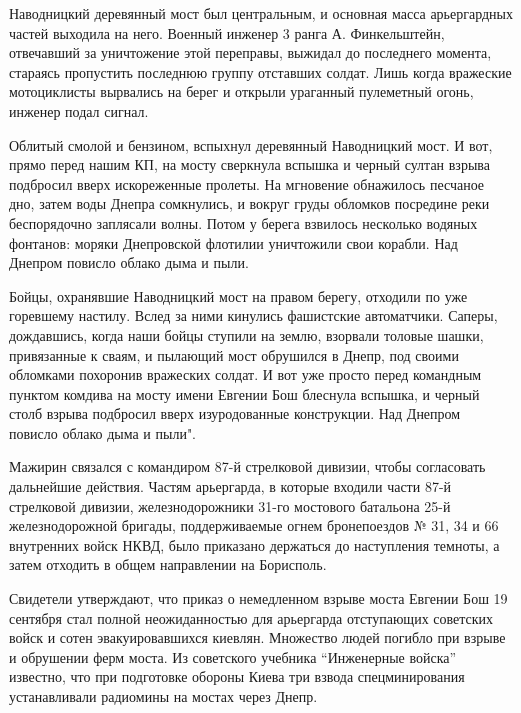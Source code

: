 
Наводницкий деревянный мост был центральным, и основная масса арьергардных
частей выходила на него. Военный инженер 3 ранга А. Финкельштейн, отвечавший за
уничтожение этой переправы, выжидал до последнего момента, стараясь пропустить
последнюю группу отставших солдат. Лишь когда вражеские мотоциклисты вырвались
на берег и открыли ураганный пулеметный огонь, инженер подал сигнал.


Облитый смолой и бензином, вспыхнул деревянный Наводницкий мост. И вот, прямо
перед нашим КП, на мосту сверкнула вспышка и черный султан взрыва подбросил
вверх искореженные  пролеты. На мгновение обнажилось песчаное дно, затем воды
Днепра сомкнулись, и вокруг  груды обломков посредине реки беспорядочно
заплясали волны. Потом у берега взвилось несколько водяных фонтанов: моряки
Днепровской флотилии уничтожили свои корабли. Над Днепром повисло облако дыма и
пыли.


Бойцы, охранявшие Наводницкий мост на правом берегу, отходили по уже горевшему
настилу. Вслед за ними кинулись фашистские автоматчики. Саперы, дождавшись,
когда наши бойцы ступили на землю, взорвали толовые шашки, привязанные к сваям,
и пылающий мост обрушился в Днепр, под своими обломками похоронив вражеских
солдат. И вот уже просто перед командным пунктом комдива на мосту имени Евгении
Бош блеснула вспышка, и черный столб взрыва подбросил вверх изуродованные
конструкции. Над Днепром повисло облако дыма и пыли".

Мажирин связался с командиром 87-й стрелковой дивизии, чтобы согласовать
дальнейшие действия. Частям арьергарда, в которые входили части 87-й стрелковой
дивизии,  железнодорожники 31-го мостового батальона 25-й железнодорожной
бригады, поддерживаемые огнем бронепоездов № 31, 34 и 66 внутренних войск НКВД,
было приказано держаться до наступления темноты, а затем отходить в общем
направлении на Борисполь.

Свидетели утверждают, что приказ о немедленном взрыве моста Евгении Бош 19
сентября стал полной неожиданностью для арьергарда отступающих советских войск
и сотен эвакуировавшихся киевлян. Множество людей погибло при взрыве и
обрушении ферм моста. Из советского учебника \enquote{Инженерные войска} известно, что
при подготовке обороны Киева три взвода спецминирования устанавливали радиомины
на мостах через Днепр.

